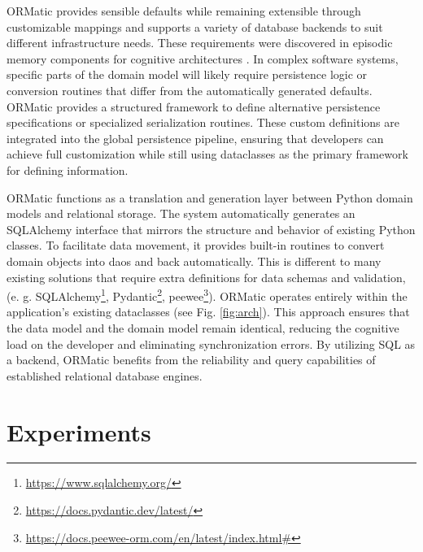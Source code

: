 \documentclass{article}
\begin{document}
ORMatic provides sensible defaults while remaining extensible through customizable mappings and supports a variety of database backends to suit different infrastructure needs. These requirements were discovered in episodic memory components for cognitive architectures \cite{beetz2025robot}.
In complex software systems, specific parts of the domain model will likely require persistence logic or conversion routines that differ from the automatically generated defaults. 
ORMatic provides a structured framework to define alternative persistence specifications or specialized serialization routines. These custom definitions are integrated into the global persistence pipeline, ensuring that developers can achieve full customization while still using dataclasses as the primary framework for defining information.

ORMatic functions as a translation and generation layer between Python domain models and relational storage. The system automatically generates an SQLAlchemy interface that mirrors the structure and behavior of existing Python classes. To facilitate data movement, it provides built-in routines to convert domain objects into \acp{dao} and back automatically.
This is different to many existing solutions that require extra definitions for data schemas and validation, (e. g. SQLAlchemy\footnote{\url{https://www.sqlalchemy.org/}}, Pydantic\footnote{\url{https://docs.pydantic.dev/latest/}}, peewee\footnote{\url{https://docs.peewee-orm.com/en/latest/index.html#}}). ORMatic operates entirely within the application's existing dataclasses (see Fig. \ref{fig:arch}). 
This approach ensures that the data model and the domain model remain identical, reducing the cognitive load on the developer and eliminating synchronization errors. By utilizing SQL as a backend, ORMatic benefits from the reliability and query capabilities of established relational database engines.




\section{Experiments}
\label{sec:experiments}
\end{document}
